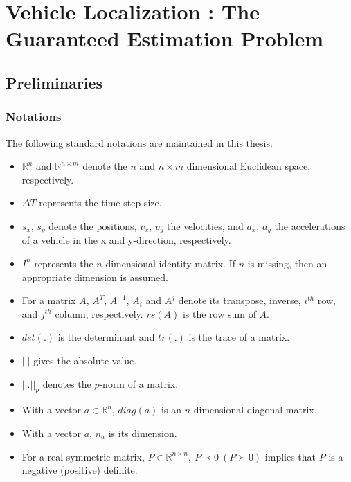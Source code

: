 \chapter{Vehicle Localization : The Guaranteed Estimation Problem} \label{ch:problem}
\section{Preliminaries}
\subsection{Notations}
The following standard notations are maintained in this thesis.
\begin{itemize}
\item{$\mathbb{R}^n$ and $\mathbb{R}^{n \times m}$ denote the $n$ and $n \times m$ dimensional Euclidean space, respectively.}
\item{$\Delta T$ represents the time step size.}
\item{$s_x$, $s_y$ denote the positions, $v_x$, $v_y$ the velocities, and $a_x$, $a_y$ the accelerations of a vehicle in the x and y-direction, respectively.}
\item{$I^n$ represents the $n$-dimensional identity matrix. If $n$ is missing, then an appropriate dimension is assumed.}
\item{For a matrix $A$, $A^T$, $A^{-1}$, $A_{i}$ and $A^{j}$ denote its transpose, inverse, $i^{th}$ row, and $j^{th}$ column, respectively. $rs(A)$ is the row sum of $A$.}
\item{ $det(.)$ is the determinant and $tr(.)$ is the trace of a matrix.}
\item{$|.|$ gives the absolute value.}
\item{$||.||_{p}$ denotes the $p$-norm of a matrix.}
\item{With a vector $a \in \mathbb{R}^n$, $diag(a)$ is an $n$-dimensional diagonal matrix.}
\item{With a vector $a$, $n_a$ is its dimension.}
\item{For a real symmetric matrix, $P \in \mathbb{R}^{n \times n},~P \prec 0~(P \succ 0)$ implies that $P$ is a negative (positive) definite.}
\end{itemize}
